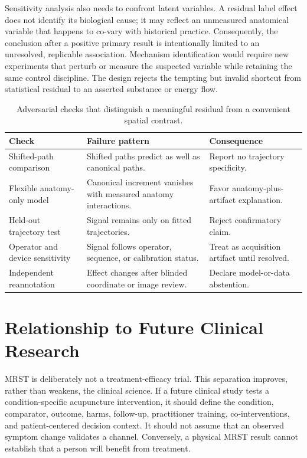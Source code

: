\documentclass[conference]{IEEEtran}
\begin{document}
Sensitivity analysis also needs to confront latent variables. A residual label effect does not identify its biological cause; it may reflect an unmeasured anatomical variable that happens to co-vary with historical practice. Consequently, the conclusion after a positive primary result is intentionally limited to an unresolved, replicable association. Mechanism identification would require new experiments that perturb or measure the suspected variable while retaining the same control discipline. The design rejects the tempting but invalid shortcut from statistical residual to an asserted substance or energy flow.

\begin{table}[!t]
\caption{Adversarial checks that distinguish a meaningful residual from a convenient spatial contrast.}
\label{tab:adversarial}
\centering
\footnotesize
\begin{tabular}{p{}|p{}|p{}}
\hline
\textbf{Check} & \textbf{Failure pattern} & \textbf{Consequence} \\
\hline
Shifted-path comparison & Shifted paths predict as well as canonical paths. & Report no trajectory specificity. \\
\hline
Flexible anatomy-only model & Canonical increment vanishes with measured anatomy interactions. & Favor anatomy-plus-artifact explanation. \\
\hline
Held-out trajectory test & Signal remains only on fitted trajectories. & Reject confirmatory claim. \\
\hline
Operator and device sensitivity & Signal follows operator, sequence, or calibration status. & Treat as acquisition artifact until resolved. \\
\hline
Independent reannotation & Effect changes after blinded coordinate or image review. & Declare model-or-data abstention. \\
\hline
\end{tabular}
\end{table}

\section{Relationship to Future Clinical Research}

MRST is deliberately not a treatment-efficacy trial. This separation improves, rather than weakens, the clinical science. If a future clinical study tests a condition-specific acupuncture intervention, it should define the condition, comparator, outcome, harms, follow-up, practitioner training, co-interventions, and patient-centered decision context. It should not assume that an observed symptom change validates a channel. Conversely, a physical MRST result cannot establish that a person will benefit from treatment.
\end{document}
